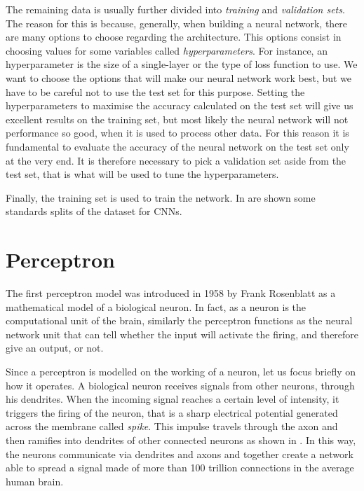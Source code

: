 \documentclass[12pt,a4paper]{report}
\theoremstyle{definition}
\begin{document}
The remaining data is usually further divided into \emph{training} and \emph{validation sets}.
The reason for this is because, generally, when building a neural network, there are many options to choose regarding the architecture. This options consist in choosing values for some variables called \emph{hyperparameters}. For instance, an hyperparameter is the size of a single-layer or the type of loss function to use. We want to choose the options that will make our neural network work best, but we have to be careful not to use the test set for this purpose.
Setting the hyperparameters to maximise the accuracy calculated on the test set will give us excellent results on the training set, but most likely the neural network will not performance so good, when it is used to process other data.
For this reason it is fundamental to evaluate the accuracy of the neural network on the test set only at the very end. It is therefore necessary to pick a validation set aside from the test set, that is what will be used to tune the hyperparameters.

Finally, the training set is used to train the network. In  are shown some standards splits of the dataset for CNNs.

\section{Perceptron}
\label{sec:perceptron}

The first perceptron model was introduced in 1958 by Frank Rosenblatt \cite{Rosenblatt} as a mathematical model of a biological neuron. In fact, as a neuron is the computational unit of the brain, similarly the perceptron functions as the neural network unit that can tell whether the input will activate the firing, and therefore give an output, or not.

Since a perceptron is modelled on the working of a neuron, let us focus briefly on how it operates. A biological neuron receives signals from other neurons, through his dendrites. When the incoming signal reaches a certain level of intensity, it triggers the firing of the neuron, that is a sharp electrical potential generated across the membrane called \emph{spike}. This impulse travels through the axon and then ramifies into dendrites of other connected neurons as shown in . In this way, the neurons communicate via dendrites and axons and together create a network able to spread a signal made of more than 100 trillion connections in the average human brain.
\end{document}
